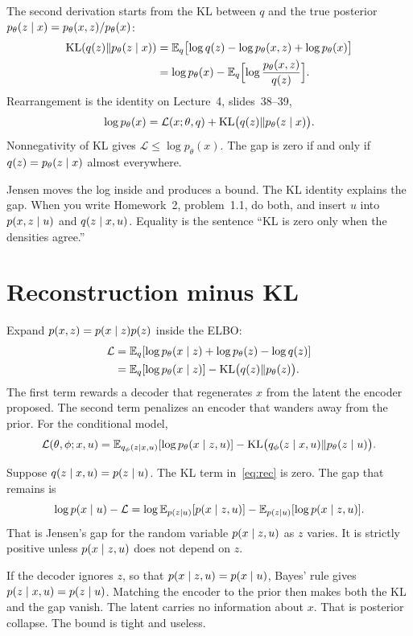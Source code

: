 The second derivation starts from the KL between $q$ and the true posterior $p_\theta(z\mid x)=p_\theta(x,z)/p_\theta(x)$:
\begin{align*}
\mathrm{KL}(q(z)\Vert p_\theta(z\mid x))
&=\mathbb{E}_q\bigl[\log q(z)-\log p_\theta(x,z)+\log p_\theta(x)\bigr]\\
&=\log p_\theta(x)-\mathbb{E}_q\Bigl[\log\frac{p_\theta(x,z)}{q(z)}\Bigr].
\end{align*}
Rearrangement is the identity on Lecture~4, slides~38--39,
\begin{equation}
\label{eq:elbokl}
\log p_\theta(x)=\mathcal L(x;\theta,q)+\mathrm{KL}\bigl(q(z)\Vert p_\theta(z\mid x)\bigr).
\end{equation}
Nonnegativity of KL gives $\mathcal L\le\log p_\theta(x)$. The gap is zero if and only if $q(z)=p_\theta(z\mid x)$ almost everywhere.

\begin{intbox}
Jensen moves the log inside and produces a bound. The KL identity explains the gap. When you write Homework~2, problem~1.1, do both, and insert $u$ into $p(x,z\mid u)$ and $q(z\mid x,u)$. Equality is the sentence ``KL is zero only when the densities agree.''
\end{intbox}

\section{Reconstruction minus KL}

Expand $p(x,z)=p(x\mid z)p(z)$ inside the ELBO:
\begin{align*}
\mathcal L
&=\mathbb{E}_q[\log p_\theta(x\mid z)+\log p_\theta(z)-\log q(z)]\\
&=\mathbb{E}_q[\log p_\theta(x\mid z)]-\mathrm{KL}\bigl(q(z)\Vert p_\theta(z)\bigr).
\end{align*}
The first term rewards a decoder that regenerates $x$ from the latent the encoder proposed. The second term penalizes an encoder that wanders away from the prior. For the conditional model,
\begin{equation}
\label{eq:rec}
\mathcal L(\theta,\phi;x,u)
=\mathbb{E}_{q_\phi(z\mid x,u)}[\log p_\theta(x\mid z,u)]
-\mathrm{KL}\bigl(q_\phi(z\mid x,u)\Vert p_\theta(z\mid u)\bigr).
\end{equation}

\begin{pitbox}
Suppose $q(z\mid x,u)=p(z\mid u)$. The KL term in~\eqref{eq:rec} is zero. The gap that remains is
\[
\log p(x\mid u)-\mathcal L
=\log\mathbb{E}_{p(z\mid u)}[p(x\mid z,u)]
-\mathbb{E}_{p(z\mid u)}[\log p(x\mid z,u)].
\]
That is Jensen's gap for the random variable $p(x\mid z,u)$ as $z$ varies. It is strictly positive unless $p(x\mid z,u)$ does not depend on $z$.

If the decoder ignores $z$, so that $p(x\mid z,u)=p(x\mid u)$, Bayes' rule gives $p(z\mid x,u)=p(z\mid u)$. Matching the encoder to the prior then makes both the KL and the gap vanish. The latent carries no information about $x$. That is posterior collapse. The bound is tight and useless.
\end{pitbox}

